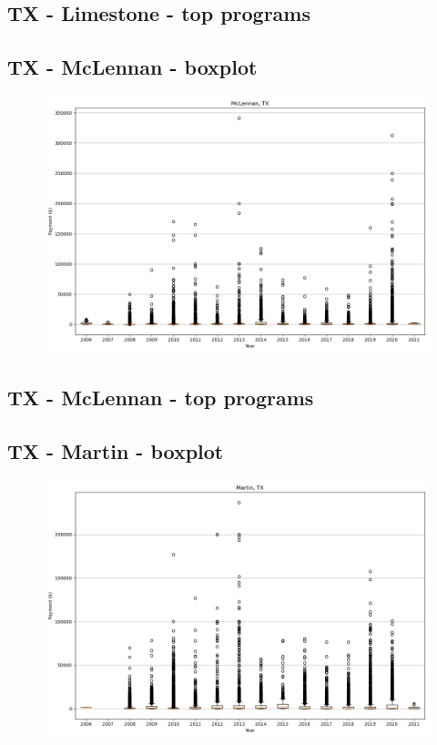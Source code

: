 \subsection*{TX - Limestone - top programs}

\newpage
\subsection*{TX - McLennan - boxplot}
\begin{figure}[h]
\centering
\includegraphics[width=7in]{../output/boxplots/counties/McLennan-TX_boxplot.png}
\end{figure}


\subsection*{TX - McLennan - top programs}

\newpage
\subsection*{TX - Martin - boxplot}
\begin{figure}[h]
\centering
\includegraphics[width=7in]{../output/boxplots/counties/Martin-TX_boxplot.png}
\end{figure}


